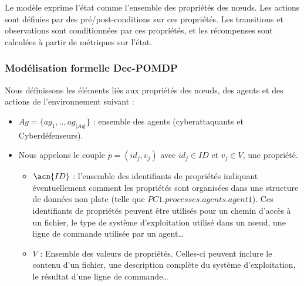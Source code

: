 \noindent
Le modèle  exprime l'état comme l'ensemble des propriétés des nœuds. Les actions sont définies par des pré/post-conditions sur ces propriétés. Les transitions et observations sont conditionnées par ces propriétés, et les récompenses sont calculées à partir de métriques sur l'état.

\subsubsection{Modélisation formelle Dec-POMDP}

Nous définissons les éléments liés aux propriétés des nœuds, des agents et des actions de l'environnement suivant :

\begin{itemize}

  \item $Ag = \{ag_1,..,ag_{|Ag|}\}$ : ensemble des agents (cyberattaquants et Cyberdéfenseurs).

  \item Nous appelons le couple $p = (id_{j}, v_{j})$ avec $id_j \in {ID}$ et $v_j \in V$, une propriété.
        \begin{itemize}
          \item $\acn{ID}$ : l'ensemble des identifiants de propriétés indiquant éventuellement comment les propriétés sont organisées dans une structure de données non plate (telle que $PC1.processes.agents.agent1$). Ces identifiants de propriétés peuvent être utilisés pour un chemin d'accès à un fichier, le type de système d'exploitation utilisé dans un nœud, une ligne de commande utilisée par un agent\dots
          \item $V$ : Ensemble des valeurs de propriétés. Celles-ci peuvent inclure le contenu d'un fichier, une description complète du système d'exploitation, le résultat d'une ligne de commande\dots
        \end{itemize}


\end{itemize}
